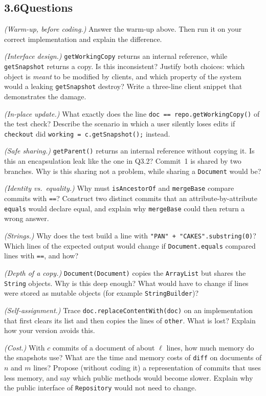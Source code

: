 \documentclass[11pt,a4paper]{article}
\newcommand{\code}[1]{\lstinline[basicstyle=\ttfamily\normalsize,basewidth=0.5em]{#1}}
\begin{document}
\subsection*{3.6\quad Questions}
\begin{questions}
  \item \emph{(Warm-up, before coding.)} Answer the warm-up above. Then run it
        on your correct implementation and explain the difference.
  \item \emph{(Interface design.)} \code{getWorkingCopy} returns an internal
        reference, while \code{getSnapshot} returns a copy. Is this
        inconsistent? Justify both choices: which object is \emph{meant} to be
        modified by clients, and which property of the system would a leaking
        \code{getSnapshot} destroy? Write a three-line client snippet that
        demonstrates the damage.
  \item \emph{(In-place update.)} What exactly does the line
        \code{doc == repo.getWorkingCopy()} of the test check?
        Describe the scenario in which a user silently loses edits if
        \code{checkout} did \code{working = c.getSnapshot();} instead.
  \item \emph{(Safe sharing.)} \code{getParent()} returns an internal reference
        without copying it. Is this an encapsulation leak like the one in
        Q3.2? Commit~1 is shared by two branches. Why is this sharing not a
        problem, while sharing a \code{Document} would be?
  \item \emph{(Identity vs.\ equality.)} Why must \code{isAncestorOf} and
        \code{mergeBase} compare commits with \code{==}? Construct two distinct
        commits that an attribute-by-attribute \code{equals} would declare equal,
        and explain why \code{mergeBase} could then return a wrong answer.
  \item \emph{(Strings.)} Why does the test build a line with
        \code{"PAN" + "CAKES".substring(0)}? Which lines of the expected output
        would change if \code{Document.equals} compared lines with \code{==},
        and how?
  \item \emph{(Depth of a copy.)} \code{Document(Document)} copies the
        \code{ArrayList} but shares the \code{String} objects. Why is this deep
        enough? What would have to change if lines were stored as mutable
        objects (for example \code{StringBuilder})?
  \item \emph{(Self-assignment.)} Trace \code{doc.replaceContentWith(doc)} on an
        implementation that first clears its list and then copies the lines of
        \code{other}. What is lost? Explain how your version avoids this.
  \item \emph{(Cost.)} With $c$ commits of a document of about $\ell$ lines,
        how much memory do the snapshots use? What are the time and memory costs
        of \code{diff} on documents of $n$ and $m$ lines? Propose (without
        coding it) a representation of commits that uses less memory, and say
        which public methods would become slower. Explain why the public
        interface of \code{Repository} would not need to change.
\end{questions}
\end{document}
